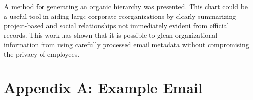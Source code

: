 \documentclass[12pt]{report}
\begin{document}
A method for generating an organic hierarchy was presented.
This chart could be a useful tool in aiding large corporate reorganizations by clearly summarizing project-based and social relationships not immediately evident from official records.
This work has shown that it is possible to glean organizational information from using carefully processed email metadata without compromising the privacy of employees.


%
%

%






\appendix

\chapter*{Appendix A: Example Email}

\end{document}
